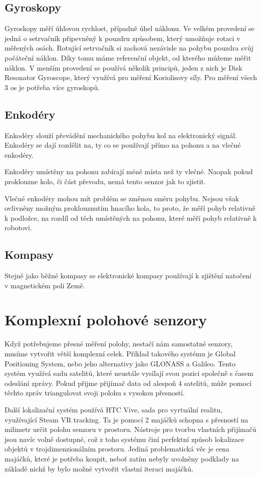 \subsection{Gyroskopy}
Gyroskopy měří úhlovou rychlost, případně úhel náklonu.
Ve velkém provedení se jedná o setrvačník připevněný k pouzdru způsobem, který umožňuje rotaci v měřených osách.
Rotující setrvačník si zachová nezávisle na pohybu pouzdra svůj počáteční náklon.
Díky tomu máme referenční objekt, od kterého můžeme měřit náklon.
V menším provedení se používá několik principů, jeden z nich je Disk Resonator Gyroscope, který využívá pro měření Koriolisovy síly.
Pro měření všech 3 os je potřeba více gyroskopů.
\cite{gyro}
\cite{gyro-2}

\subsection{Enkodéry}
Enkodéry slouží převádění mechanického pohybu kol na elektronický signál.
Enkodéry se dají rozdělit na, ty co se používají přímo na pohonu a na vlečné enkodéry.

Enkodéry umístěny na pohonu zabírají méně místa než ty vlečné. 
Naopak pokud proklouzne kolo, či část převodu, nemá tento senzor jak to zjistit.

Vlečné enkodéry mohou mít problém se změnou směru pohybu.
Nejsou však ovlivněny možným proklouznutím hnacího kola, to proto, že měří pohyb relativně k podložce, na rozdíl od těch umístěných na pohonu, které měří pohyb relativně k robotovi.


\subsection{Kompasy}
Stejně jako běžné kompasy se elektronické kompasy používají k zjištění natočení v magnetickém poli Země.

\section{Komplexní polohové senzory}
Když potřebujeme přesné měření polohy, nestačí nám samostatné senzory, musíme vytvořit větší komplexní celek.
Příklad takového systému je Global Positioning System, nebo jeho alternativy jako GLONASS a Galileo.
Tento systém využívá sadu satelitů, které neustále vysílají svou pozici společně s časem odeslání zprávy.
Pokud přijme přijímač data od alespoň 4 satelitů, může pomocí těchto zpráv triangulovat svoji polohu s vysokou přesností.

Další lokalizační systém používá HTC Vive, sada pro vyrtuální realitu, využívající Steam VR tracking.
Ta je pomocí 2 majáčků schopna s přesností na milimetr určit polohu senzoru v prostoru.
Nástroje pro tvorbu vlastních přijímačů jsou navíc volně dostupné, což z toho systému činí perfektní způsob lokalizace objektů v trojdimenzionálním prostoru.
Jediná problematická věc je cena majáčků, které je potřeba koupit, neboť zatím nebyly uvolněny podklady na základě nichž by bylo možné vytvořit vlastní iteraci majáčků.

